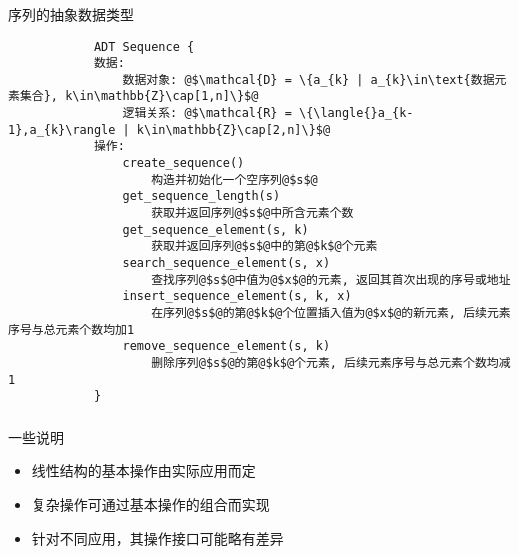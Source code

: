 \begin{fragile}
    \frametitle{\insertsectionhead}
    \begin{block}{序列的抽象数据类型}
        \begin{verbatim}
            ADT Sequence {
            数据:
                数据对象: @$\mathcal{D} = \{a_{k} | a_{k}\in\text{数据元素集合}, k\in\mathbb{Z}\cap[1,n]\}$@
                逻辑关系: @$\mathcal{R} = \{\langle{}a_{k-1},a_{k}\rangle | k\in\mathbb{Z}\cap[2,n]\}$@
            操作:
                create_sequence()
                    构造并初始化一个空序列@$s$@
                get_sequence_length(s)
                    获取并返回序列@$s$@中所含元素个数
                get_sequence_element(s, k)
                    获取并返回序列@$s$@中的第@$k$@个元素
                search_sequence_element(s, x)
                    查找序列@$s$@中值为@$x$@的元素, 返回其首次出现的序号或地址
                insert_sequence_element(s, k, x)
                    在序列@$s$@的第@$k$@个位置插入值为@$x$@的新元素, 后续元素序号与总元素个数均加1
                remove_sequence_element(s, k)
                    删除序列@$s$@的第@$k$@个元素, 后续元素序号与总元素个数均减1
            }
        \end{verbatim}
    \end{block}
\end{fragile}

\begin{frame}
    \frametitle{\insertsectionhead}
    \begin{alertblock}{一些说明}
        \begin{itemize}
            \item 线性结构的基本操作由实际应用而定
            \item 复杂操作可通过基本操作的组合而实现
            \item 针对不同应用，其操作接口可能略有差异
        \end{itemize}
    \end{alertblock}
\end{frame}

